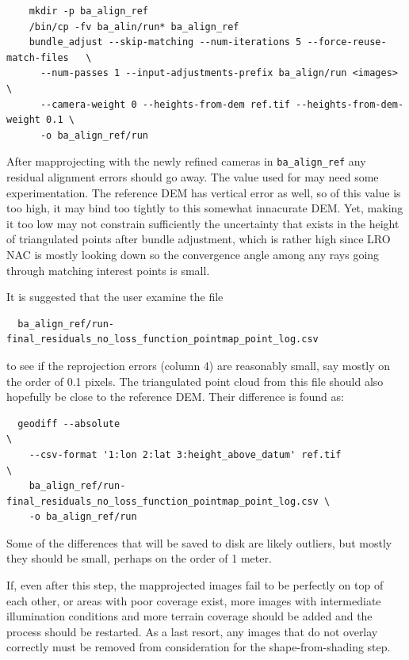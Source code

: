 \begin{verbatim}
    mkdir -p ba_align_ref
    /bin/cp -fv ba_alin/run* ba_align_ref
    bundle_adjust --skip-matching --num-iterations 5 --force-reuse-match-files   \
      --num-passes 1 --input-adjustments-prefix ba_align/run <images>            \
      --camera-weight 0 --heights-from-dem ref.tif --heights-from-dem-weight 0.1 \ 
      -o ba_align_ref/run
\end{verbatim}

After mapprojecting with the newly refined cameras in \texttt{ba\_align\_ref}
any residual alignment errors should go away. The value used for
 may need some experimentation. The reference
DEM has vertical error as well, so of this value is too high, it may bind too
tightly to this somewhat innacurate DEM. Yet, making it too low may not
constrain sufficiently the uncertainty that exists in the height of triangulated
points after bundle adjustment, which is rather high since LRO NAC is mostly looking
down so the convergence angle among any rays going through matching interest points
is small.

It is suggested that the user examine the file
\begin{verbatim}
  ba_align_ref/run-final_residuals_no_loss_function_pointmap_point_log.csv
\end{verbatim}

to see if the reprojection errors (column 4) are reasonably small, say mostly
on the order of 0.1 pixels. The triangulated point cloud
from this file should also hopefully be close to the reference DEM. Their
difference is found as:
\begin{verbatim}
  geodiff --absolute                                                         \
    --csv-format '1:lon 2:lat 3:height_above_datum' ref.tif                  \
    ba_align_ref/run-final_residuals_no_loss_function_pointmap_point_log.csv \
    -o ba_align_ref/run
\end{verbatim}

Some of the differences that will be saved to disk are likely outliers,
but mostly they should be small, perhaps on the order of 1 meter.

If, even after this step, the mapprojected images fail to be perfectly
on top of each other, or areas with poor coverage exist, more images
with intermediate illumination conditions and more terrain coverage
should be added and the process should be restarted. As a last resort,
any images that do not overlay correctly must be removed from
consideration for the shape-from-shading step.

